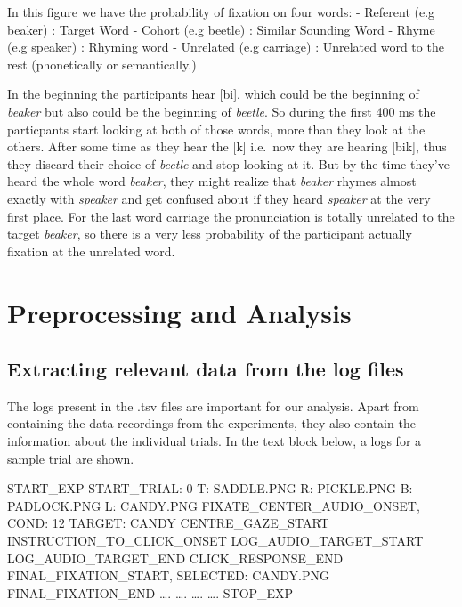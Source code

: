 \documentclass[
  a4paper,
]{article}
\newenvironment{Shaded}{}{}
\newcommand{\NormalTok}[1]{\textcolor[rgb]{0.14,0.16,0.18}{#1}}
\begin{document}
In this figure we have the probability of fixation on four words: -
Referent (e.g beaker) : Target Word - Cohort (e.g beetle) : Similar
Sounding Word - Rhyme (e.g speaker) : Rhyming word - Unrelated (e.g
carriage) : Unrelated word to the rest (phonetically or semantically.)

In the beginning the participants hear {[}bi{]}, which could be the
beginning of \emph{beaker} but also could be the beginning of
\emph{beetle}. So during the first 400 ms the particpants start looking
at both of those words, more than they look at the others. After some
time as they hear the {[}k{]} i.e.~now they are hearing {[}bik{]}, thus
they discard their choice of \emph{beetle} and stop looking at it. But
by the time they've heard the whole word \emph{beaker}, they might
realize that \emph{beaker} rhymes almost exactly with \emph{speaker} and
get confused about if they heard \emph{speaker} at the very first place.
For the last word carriage the pronunciation is totally unrelated to the
target \emph{beaker}, so there is a very less probability of the
participant actually fixation at the unrelated word.

\hypertarget{preprocessing-and-analysis}{%
\section{Preprocessing and Analysis}\label{preprocessing-and-analysis}}

\hypertarget{extracting-relevant-data-from-the-log-files}{%
\subsection{Extracting relevant data from the log
files}\label{extracting-relevant-data-from-the-log-files}}

The logs present in the .tsv files are important for our analysis. Apart
from containing the data recordings from the experiments, they also
contain the information about the individual trials. In the text block
below, a logs for a sample trial are shown.

\begin{Shaded}
\begin{Highlighting}[]
\NormalTok{START\_EXP}
\NormalTok{START\_TRIAL: 0 T: SADDLE.PNG R: PICKLE.PNG B: PADLOCK.PNG L: CANDY.PNG}
\NormalTok{FIXATE\_CENTER\_AUDIO\_ONSET, COND: 12 TARGET: CANDY}
\NormalTok{CENTRE\_GAZE\_START}
\NormalTok{INSTRUCTION\_TO\_CLICK\_ONSET}
\NormalTok{LOG\_AUDIO\_TARGET\_START}
\NormalTok{LOG\_AUDIO\_TARGET\_END}
\NormalTok{CLICK\_RESPONSE\_END}
\NormalTok{FINAL\_FIXATION\_START, SELECTED: CANDY.PNG}
\NormalTok{FINAL\_FIXATION\_END}
\NormalTok{….}
\NormalTok{….}
\NormalTok{….}
\NormalTok{….}
\NormalTok{STOP\_EXP}
\end{Highlighting}
\end{Shaded}
\end{document}
